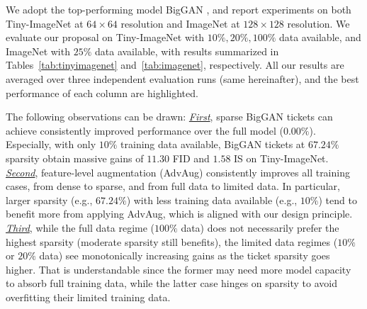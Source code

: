 \documentclass{article}
\begin{document}
We adopt the top-performing model BigGAN \cite{brock2018large}, and report experiments on both Tiny-ImageNet at $64\times64$ resolution and ImageNet at $128\times128$ resolution. We evaluate our proposal on Tiny-ImageNet with $10\%,20\%,100\%$ data available, and ImageNet with $25\%$ data available, with results summarized in Tables~\ref{tab:tinyimagenet} and~\ref{tab:imagenet}, respectively. All our results are averaged over three independent evaluation runs (same hereinafter), and the best performance of each column are highlighted. 

The following observations can be drawn: \underline{\textit{First}}, sparse BigGAN tickets can achieve consistently improved performance over the full model ($0.00\%$).
Especially, with only $10\%$ training data available, BigGAN tickets at $67.24\%$ sparsity obtain massive gains of $11.30$ FID and $1.58$ IS on Tiny-ImageNet. \underline{\textit{Second}}, feature-level augmentation (AdvAug) consistently improves all training cases, from dense to sparse, and from full data to limited data. In particular, larger sparsity (e.g.,  $67.24\%$) with less training data available (e.g., $10\%$) tend to benefit more from applying AdvAug, which is aligned with our design principle. \underline{\textit{Third}}, while the full data regime ($100\%$ data) does not necessarily prefer the highest sparsity (moderate sparsity still benefits), the limited data regimes ($10\%$ or $20\%$ data) see monotonically increasing gains as the ticket sparsity goes higher. That is understandable since the former may need more model capacity to absorb full training data, while the latter case hinges on sparsity to avoid overfitting their limited training data.
\end{document}
